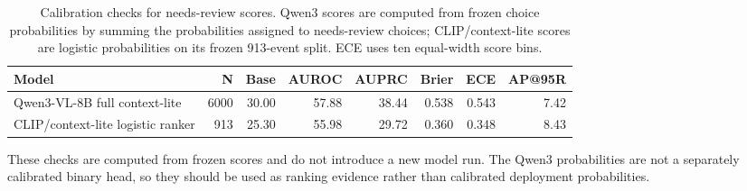 \begin{table}[h]
\centering
\caption{Calibration checks for needs-review scores. Qwen3 scores are computed from frozen choice probabilities by summing the probabilities assigned to needs-review choices; CLIP/context-lite scores are logistic probabilities on its frozen 913-event split. ECE uses ten equal-width score bins.}
\label{tab:calibration_appendix}
\small
\setlength{\tabcolsep}{4pt}
\begin{tabular}{lrrrrrrr}
\toprule
Model & N & Base & AUROC & AUPRC & Brier & ECE & AP@95R \\
\midrule
Qwen3-VL-8B full context-lite & 6000 & 30.00 & 57.88 & 38.44 & 0.538 & 0.543 & 7.42 \\
CLIP/context-lite logistic ranker & 913 & 25.30 & 55.98 & 29.72 & 0.360 & 0.348 & 8.43 \\
\bottomrule
\end{tabular}
\vspace{0.25em}
\begin{minipage}{0.95\linewidth}
\footnotesize These checks are computed from frozen scores and do not introduce a new model run. The Qwen3 probabilities are not a separately calibrated binary head, so they should be used as ranking evidence rather than calibrated deployment probabilities.
\end{minipage}
\end{table}
